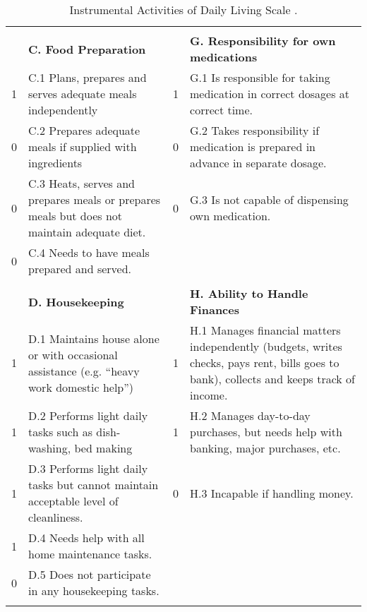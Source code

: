 \documentclass[main.tex]{subfiles}
\begin{document}
\begin{center}
\begin{longtable}{ |p{0.8cm}p{6.8cm}|p{0.8cm}p{6.8cm}|  }
 \vspace{0.15cm} & & &\\

 & \textbf{C. Food Preparation} & & \textbf{G. Responsibility for own medications}\\
 
 1 & C.1 Plans, prepares and serves adequate meals independently & 1 & G.1 Is responsible for taking medication in correct dosages at correct time.\\
 
 0 & C.2 Prepares adequate meals if supplied with ingredients & 0 & G.2 Takes responsibility if medication is prepared in advance in separate dosage.\\
 
 0 & C.3 Heats, serves and prepares meals or prepares meals but does not maintain adequate diet. & 0 & G.3 Is not capable of dispensing own medication.\\
 
 0 & C.4 Needs to have meals prepared and served. & & \\
 
 \vspace{0.15cm} & & &\\
  
 & \textbf{D. Housekeeping} & & \textbf{H. Ability to Handle Finances}\\ 
 
 1 & D.1 Maintains house alone or with occasional assistance (e.g. “heavy work domestic help”) & 1 & H.1 Manages financial matters independently (budgets, writes checks, pays rent, bills goes to bank), collects and keeps track of income.\\
 
 1 & D.2 Performs light daily tasks such as dish-washing, bed making & 1 & H.2 Manages day-to-day purchases, but needs
help with banking, major purchases, etc.\\

 1 & D.3 Performs light daily tasks but cannot maintain acceptable level of cleanliness. & 0 & H.3 Incapable if handling money.\\
 
 1 & D.4 Needs help with all home maintenance tasks. & & \\
 0 & D.5 Does not participate in any housekeeping tasks. & &\\
  
 \hline
 \caption{Instrumental Activities of Daily Living Scale \cite{lawton1970assessment}.}
 \label{tab:IADL}
\end{longtable}
\end{center}
\end{document}
